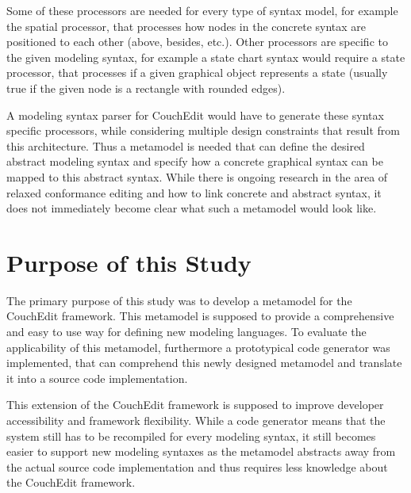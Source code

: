 Some of these processors are needed for every type of syntax model, for example the spatial processor, that processes how nodes in the concrete syntax are positioned to each other (above, besides, etc.). Other processors are specific to the given modeling syntax, for example a state chart syntax would require a state processor, that processes if a given graphical object represents a state (usually true if the given node is a rectangle with rounded edges).

A modeling syntax parser for CouchEdit would have to generate these syntax specific processors, while considering multiple design constraints that result from this architecture. Thus a metamodel is needed that can define the desired abstract modeling syntax and specify how a concrete graphical syntax can be mapped to this abstract syntax. While there is ongoing research in the area of relaxed conformance editing and how to link concrete and abstract syntax, it does not immediately become clear what such a metamodel would look like.

\section{Purpose of this Study}
The primary purpose of this study was to develop a metamodel for the CouchEdit framework. This metamodel is supposed to provide a comprehensive and easy to use way for defining new modeling languages. To evaluate the applicability of this metamodel, furthermore a prototypical code generator was implemented, that can comprehend this newly designed metamodel and translate it into a source code implementation.

This extension of the CouchEdit framework is supposed to improve developer accessibility and framework flexibility. While a code generator means that the system still has to be recompiled for every modeling syntax, it still becomes easier to support new modeling syntaxes as the metamodel abstracts away from the actual source code implementation and thus requires less knowledge about the CouchEdit framework.